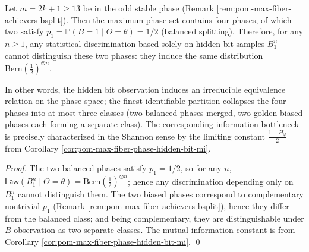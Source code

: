 \begin{proposition}\label{prop:pom-max-fiber-odd-indistinguishability}
Let \(m=2k+1\ge 13\) be in the odd stable phase (Remark \ref{rem:pom-max-fiber-achievers-bsplit}).
Then the maximum phase set contains four phases, of which two satisfy \(p_1=\mathbb{P}(B=1\mid\Theta=\theta)=1/2\) (balanced splitting).
Therefore, for any \(n\ge 1\), any statistical discrimination based solely on hidden bit samples \(B_1^n\) cannot distinguish these two phases: they induce the same distribution \(\mathrm{Bern}(\tfrac12)^{\otimes n}\).
\par
In other words, the hidden bit observation induces an irreducible equivalence relation on the phase space; the finest identifiable partition collapses the four phases into at most three classes (two balanced phases merged, two golden-biased phases each forming a separate class).
The corresponding information bottleneck is precisely characterized in the Shannon sense by the limiting constant \(\frac{1-H_\varphi}{2}\) from Corollary \ref{cor:pom-max-fiber-phase-hidden-bit-mi}.
\end{proposition}

\begin{proof}
The two balanced phases satisfy \(p_1=1/2\), so for any \(n\),
\(
\mathsf{Law}(B_1^n\mid\Theta=\theta)=\mathrm{Bern}(\tfrac12)^{\otimes n}
\);
hence any discrimination depending only on \(B_1^n\) cannot distinguish them.
The two biased phases correspond to complementary nontrivial \(p_1\) (Remark \ref{rem:pom-max-fiber-achievers-bsplit}), hence they differ from the balanced class; and being complementary, they are distinguishable under \(B\)-observation as two separate classes.
The mutual information constant is from Corollary \ref{cor:pom-max-fiber-phase-hidden-bit-mi}. \qed
\end{proof}




\endinput


